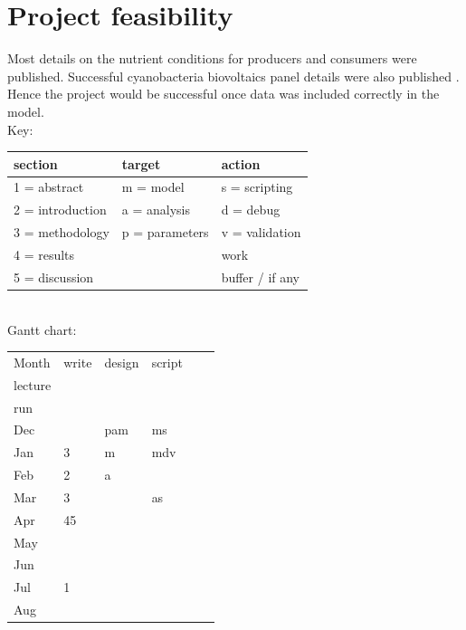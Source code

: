 \documentclass[a4paper, 11pt]{article}
\begin{document}
\section{Project feasibility}
Most details on the nutrient conditions for producers \autocite{duarte2009microbial,markou2014microalgal} and consumers \autocite{neff1957purification,mooshammer2014stoichiometric} were published.  Successful cyanobacteria biovoltaics panel details were also published \autocite{mccormick2015biophotovoltaics}.  Hence the project would be successful once data was included correctly in the model.\\
Key:
\begin{tabular}{lll}
	section & target & action\\\hline
	1 = abstract & m = model & s = scripting\\
	2 = introduction & a = analysis & d = debug\\
	3 = methodology & p = parameters & v = validation\\
	4 = results && \cellcolor{grey90}work\\
	5 = discussion && \cellcolor{lorange}buffer / if any\\
\end{tabular}\\
Gantt chart:\\
\begin{longtable}{p{.1\linewidth}|p{.1\linewidth}|p{.1\linewidth}|p{.1\linewidth}|p{.1\linewidth}|p{.1\linewidth}|}
	Month	&write					&design					&script					& \begin{tabular}{c}MSc\\lecture\end{tabular}	& \begin{tabular}{c}model\\run\end{tabular}\\\hline
	Dec		&						&\cellcolor{grey90}pam	&\cellcolor{grey90}ms	&\cellcolor{lorange}							&										\\
	Jan		&\cellcolor{grey90}3	&\cellcolor{grey90}m	&\cellcolor{grey90}mdv	&\cellcolor{lorange} 							&\cellcolor{grey90}						\\
	Feb		&\cellcolor{grey90}2	&\cellcolor{grey90}a	&						&\cellcolor{lorange} 							&\cellcolor{grey90}						\\
	Mar		&\cellcolor{lorange}3	&\cellcolor{lorange}	&\cellcolor{grey90}as	&\cellcolor{lorange} 							&\cellcolor{grey90}						\\
	Apr		&\cellcolor{grey90}45	&						&\cellcolor{grey90}		&												&\cellcolor{grey90}						\\
	May		&\cellcolor{grey90}		&						&\cellcolor{grey90}		&												&\cellcolor{grey90}						\\
	Jun		&\cellcolor{grey90}		&						&\cellcolor{lorange}	&												&\cellcolor{lorange}					\\
	Jul		&\cellcolor{grey90}1	&						&						&												&\cellcolor{lorange}					\\
	Aug		&\cellcolor{lorange}	&						&\cellcolor{lorange}	&												&\cellcolor{lorange}					\\
\end{longtable}
\end{document}
